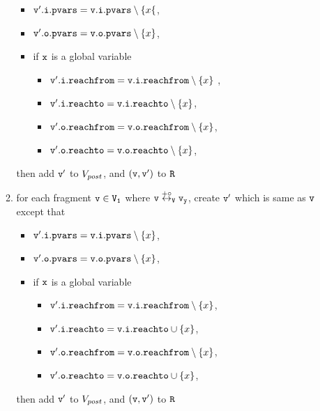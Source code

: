 \begin{itemize}
\begin{enumerate}
\begin{itemize}
\item $\mathtt{v}'.\mathtt{i}.\mathtt{pvars} = \mathtt{v}.\mathtt{i}.\mathtt{pvars} \setminus \{x\{$,
\item $\mathtt{v}'.\mathtt{o}.\mathtt{pvars} = \mathtt{v}.\mathtt{o}.\mathtt{pvars} \setminus \left\{x\right\}$,
\item if $\tt x$ is a global variable
\begin{itemize}
\item $\mathtt{v}'.\mathtt{i}.\mathtt{reachfrom} = \mathtt{v}.\mathtt{i}.\mathtt{reachfrom} \setminus \left\{x\right\}$ ,
\item $\mathtt{v}'.\mathtt{i}.\mathtt{reachto} = \mathtt{v}.\mathtt{i}.\mathtt{reachto} \setminus \left\{x\right\}$,
\item $\mathtt{v}'.\mathtt{o}.\mathtt{reachfrom} = \mathtt{v}.\mathtt{o}.\mathtt{reachfrom} \setminus \left\{x\right\}$,
\item $\mathtt{v}'.\mathtt{o}.\mathtt{reachto} = \mathtt{v}.\mathtt{o}.\mathtt{reachto} \setminus \left\{x\right\}$,
\end{itemize}
\end{itemize}
then add $\tt v'$ to $V_{post}$, and $\tt (v,v')$ to $\tt R$
\item for each fragment $\tt v \in V_1$ where $\tt v \overset{+\circ}\leftrightarrow_{V} \mathtt{v}_y$, create $\tt v'$ which is same as $\tt v$ except that 
\begin{itemize}
\item $\mathtt{v}'.\mathtt{i}.\mathtt{pvars} = \mathtt{v}.\mathtt{i}.\mathtt{pvars} \setminus \left\{x\right\}$,
\item $\mathtt{v}'.\mathtt{o}.\mathtt{pvars} = \mathtt{v}.\mathtt{o}.\mathtt{pvars} \setminus \left\{x\right\}$,
\item if $\tt x$ is a global variable
\begin{itemize}
\item $\mathtt{v}'.\mathtt{i}.\mathtt{reachfrom} = \mathtt{v}.\mathtt{i}.\mathtt{reachfrom} \setminus \left\{x\right\}$,
\item $\mathtt{v}'.\mathtt{i}.\mathtt{reachto} = \mathtt{v}.\mathtt{i}.\mathtt{reachto} \cup \left\{x\right\}$,
 \item $\mathtt{v}'.\mathtt{o}.\mathtt{reachfrom} = \mathtt{v}.\mathtt{o}.\mathtt{reachfrom} \setminus \left\{x\right\}$,
 \item $\mathtt{v}'.\mathtt{o}.\mathtt{reachto} = \mathtt{v}.\mathtt{o}.\mathtt{reachto} \cup \left\{x\right\}$,
\end{itemize}
\end{itemize}
then add $\tt v'$ to $V_{post}$, and $\tt (v,v')$ to $\tt R$


\end{enumerate}
\end{itemize}
